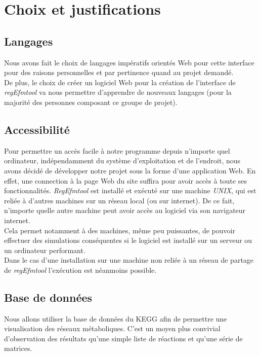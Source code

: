 \chapter{Choix et justifications}

\section{Langages}
Nous avons fait le choix de langages impératifs orientés Web pour cette interface pour des raisons personnelles et par pertinence quand au projet demandé.\\
De plus, le choix de créer un logiciel Web pour la création de l'interface de \emph{regEfmtool} va nous permettre d'apprendre de nouveaux langages (pour la majorité des personnes composant ce groupe de projet).

\section{Accessibilité}
Pour permettre un accès facile à notre programme depuis n'importe quel ordinateur, indépendamment du système d'exploitation et de l'endroit, nous avons décidé de développer notre projet sous la forme d'une application Web. En effet, une connection à la page Web du site suffira pour avoir accès à toute ses fonctionnalités. \emph{RegEfmtool} est installé et exécuté sur une machine \emph{UNIX}, qui est reliée à d'autres machines sur un réseau local (ou sur internet). De ce fait, n'importe quelle autre machine peut avoir accès au logiciel via son navigateur internet.\\
Cela permet notamment à des machines, même peu puissantes, de pouvoir effectuer des simulations conséquentes si le logiciel est installé sur un serveur ou un ordinateur performant.\\
Dans le cas d'une installation sur une machine non reliée à un réseau de partage de \emph{regEfmtool} l'exécution est néanmoins possible.

\section{Base de données}
Nous allons utiliser la base de données du KEGG afin de permettre une visualisation des réseaux métaboliques. C'est un moyen plus convivial d'observation des résultats qu'une simple liste de réactions et qu'une série de matrices. 
